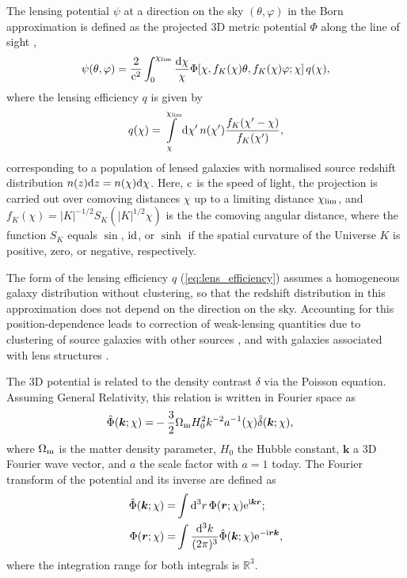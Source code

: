 \documentclass[fleqn,usenatbib]{mnras} %
\renewcommand{\vec}{\bm}
\begin{document}
The lensing potential $\psi$ at a direction on the sky $(\theta, \varphi)$ in
the Born approximation is defined as the projected 3D metric potential $\Phi$
along the line of sight \citep{1998ApJ...498...26K,BS01},
%
%
\begin{equation}
  \psi(\theta, \varphi) = \frac 2 {{\rm c}^2} \int_0^{\chi_{\rm lim}} \frac{{\rm d}\chi}{\chi}
    \Phi[\chi, f_K(\chi) \theta, f_K(\chi) \varphi; \chi] \, q(\chi),
  \label{eq:psi}
\end{equation}
%
where the lensing efficiency $q$ is given by
%
\begin{equation}
  q(\chi) = \int\limits_\chi^{\chi_{\rm lim}} {\rm d} \chi^\prime \, n(\chi^\prime)
    \frac{f_K(\chi^\prime - \chi)}{f_K(\chi^\prime)},
  \label{eq:lens_efficiency}
\end{equation}
%
corresponding to a population of lensed galaxies with normalised source
redshift distribution $n(z) {\rm d}z = n(\chi) {\rm d} \chi$. Here, ${\rm c}$
is the speed of light, the projection is carried out over comoving distances
$\chi$ up to a limiting distance $\chi_{\rm lim}$, and $f_K(\chi) = |K|^{-1/2}
S_K(|K|^{1/2} \chi)$ is the the comoving angular distance, where the function
$S_K$ equals $\sin$, ${\rm id}$, or $\sinh$ if the spatial curvature of the Universe
$K$ is positive, zero, or negative, respectively.

The form of the lensing efficiency $q$ (\ref{eq:lens_efficiency}) assumes a
homogeneous galaxy distribution without clustering, so that the redshift
distribution in this approximation does not depend on the direction on the sky.
Accounting for this position-dependence leads to correction of weak-lensing
quantities due to clustering of source galaxies with other sources
\citep{2002A&A...389..729S}, and with galaxies associated with lens structures
\citep{1998A&A...338..375B,H02}.

The 3D potential is related to the density contrast $\delta$ via the Poisson
equation. Assuming General Relativity, this relation is written in Fourier space as
%
\begin{align}
  \hat \Phi(\vec k; \chi) = & - \frac 3 2 \Omega_{\rm m} H_0^2 k^{-2} a^{-1}(\chi) \hat \delta(\vec k; \chi),
      \label{eq:poisson}
\end{align}
%
where $\Omega_{\rm m}$ is the matter density parameter, $H_0$ the Hubble constant, $\vec k$ a 3D Fourier wave
vector, and $a$ the scale factor with $a=1$ today.
The Fourier transform of the potential and its inverse are defined as
%
\begin{align}
  \hat \Phi(\vec k; \chi) = &  \int {\rm d}^3 r \, \Phi(\vec r; \chi) {\rm e}^{{\rm i} \vec k \vec r} ;
  \label{eq:hatPhi}
  \\
  \Phi(\vec r; \chi) = &  \int \frac{{\rm d}^3 k}{(2\pi)^3}
      \hat \Phi(\vec k; \chi) {\rm e}^{-{\rm i} \vec r \vec k},
  \label{eq:hatPhi_inv}
\end{align}
%
where the integration range for both integrals is $\mathbb{R}^3$.
\end{document}
